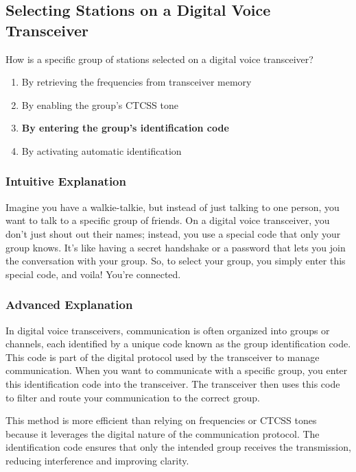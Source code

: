 \subsection{Selecting Stations on a Digital Voice Transceiver}
\label{T4B09}

\begin{tcolorbox}[colback=gray!10!white,colframe=black!75!black,title=T4B09]
How is a specific group of stations selected on a digital voice transceiver?
\begin{enumerate}[label=\Alph*)]
    \item By retrieving the frequencies from transceiver memory
    \item By enabling the group’s CTCSS tone
    \item \textbf{By entering the group’s identification code}
    \item By activating automatic identification
\end{enumerate}
\end{tcolorbox}

\subsubsection{Intuitive Explanation}
Imagine you have a walkie-talkie, but instead of just talking to one person, you want to talk to a specific group of friends. On a digital voice transceiver, you don’t just shout out their names; instead, you use a special code that only your group knows. It’s like having a secret handshake or a password that lets you join the conversation with your group. So, to select your group, you simply enter this special code, and voila! You’re connected.

\subsubsection{Advanced Explanation}
In digital voice transceivers, communication is often organized into groups or channels, each identified by a unique code known as the group identification code. This code is part of the digital protocol used by the transceiver to manage communication. When you want to communicate with a specific group, you enter this identification code into the transceiver. The transceiver then uses this code to filter and route your communication to the correct group. 

This method is more efficient than relying on frequencies or CTCSS tones because it leverages the digital nature of the communication protocol. The identification code ensures that only the intended group receives the transmission, reducing interference and improving clarity. 

